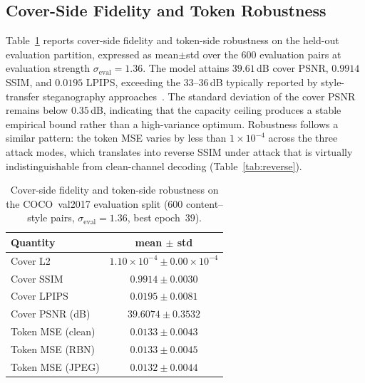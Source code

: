 \documentclass[runningheads]{llncs}
\begin{document}
\subsection{Cover-Side Fidelity and Token Robustness}
\label{sec:exp_coco}
Table~\ref{tab:cover} reports cover-side fidelity and token-side robustness on the held-out evaluation partition, expressed as mean$\pm$std over the $600$ evaluation pairs at evaluation strength $\sigma_{\text{eval}}\!=\!1.36$. The model attains $39.61$\,dB cover PSNR, $0.9914$ SSIM, and $0.0195$ LPIPS, exceeding the $33$--$36$\,dB typically reported by style-transfer steganography approaches~\cite{stylestegan2023,sst2024,stisgan2026}. The standard deviation of the cover PSNR remains below $0.35$\,dB, indicating that the capacity ceiling produces a stable empirical bound rather than a high-variance optimum. Robustness follows a similar pattern: the token MSE varies by less than $1\!\times\!10^{-4}$ across the three attack modes, which translates into reverse SSIM under attack that is virtually indistinguishable from clean-channel decoding (Table~\ref{tab:reverse}).

\begin{table}[t]
\centering
\caption{Cover-side fidelity and token-side robustness on the COCO~val2017 evaluation split ($600$ content--style pairs, $\sigma_{\text{eval}}=1.36$, best epoch~$39$).}
\label{tab:cover}
\setlength{\tabcolsep}{8pt}
\begin{tabular}{l c}
\toprule
\textbf{Quantity} & \textbf{mean $\pm$ std} \\
\midrule
Cover L2          & $1.10\!\times\!10^{-4} \pm 0.00\!\times\!10^{-4}$ \\
\rowcolor{rowshade}
Cover SSIM        & $0.9914 \pm 0.0030$ \\
Cover LPIPS       & $0.0195 \pm 0.0081$ \\
\rowcolor{rowshade}
Cover PSNR (dB)   & $\mathbf{39.6074 \pm 0.3532}$ \\
\midrule
Token MSE (clean) & $0.0133 \pm 0.0043$ \\
\rowcolor{rowshade}
Token MSE (RBN)   & $0.0133 \pm 0.0045$ \\
Token MSE (JPEG)  & $0.0132 \pm 0.0044$ \\
\bottomrule
\end{tabular}
\end{table}
\end{document}
